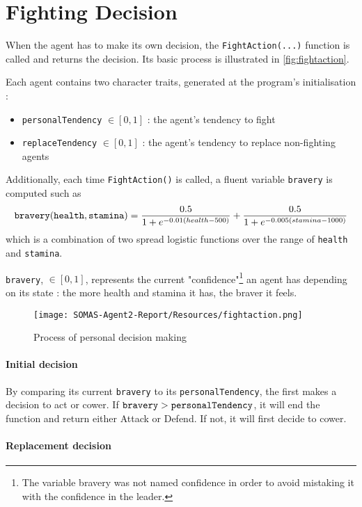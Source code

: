 \section{Fighting Decision}
When the agent has to make its own decision, the \verb|FightAction(...)| function is called and returns the decision. Its basic process is illustrated in \autoref{fig:fightaction}.

Each agent contains two character traits, generated at the program's initialisation : \begin{itemize}
    \item \verb|personalTendency| $\in[0,1]$ : the agent's tendency to fight
    \item \verb|replaceTendency| $\in[0,1]$ : the agent's tendency to replace non-fighting agents
\end{itemize}
Additionally, each time \verb|FightAction()| is called, a fluent variable \verb|bravery| is computed such as $$\verb|bravery|(\verb|health|, \verb|stamina|) = \frac{0.5}{1+e^{-0.01(health-500)}} + \frac{0.5}{1+e^{-0.005(stamina-1000)}}$$
which is a combination of two spread logistic functions over the range of \verb|health| and \verb|stamina|.

 \verb|bravery|, $\in [0,1]$, represents the current "confidence"\footnote{The variable bravery was not named confidence in order to avoid mistaking it with the confidence in the leader.} an agent has depending on its state : the more health and stamina it has, the braver it feels.

\begin{figure}[h!]
    \centering
    \texttt{[image: SOMAS-Agent2-Report/Resources/fightaction.png]}
    \caption{Process of personal decision making}
    \label{fig:fightaction}
\end{figure}

 \paragraph{Initial decision}

 By comparing its current \verb|bravery| to its \verb|personalTendency|, the first makes a decision to act or cower. If $\verb|bravery| > \verb|personalTendency|$, it will end the function and return either Attack or Defend. If not, it will first decide to cower.


 \paragraph{Replacement decision}

